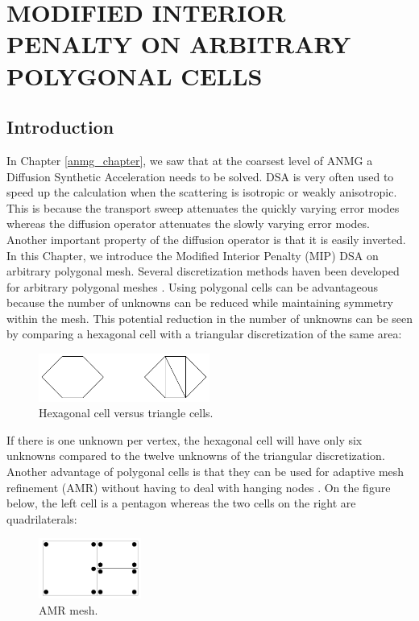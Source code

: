 \chapter{\uppercase{Modified Interior Penalty on Arbitrary Polygonal Cells}}
\label{mip_chapter}
\section{Introduction}
In Chapter \ref{anmg_chapter}, we saw that at the coarsest level of ANMG a Diffusion
Synthetic Acceleration needs to be solved. DSA is very often used to speed up the
calculation when the scattering is isotropic or weakly anisotropic. This is
because the transport sweep attenuates the quickly varying error modes whereas
the diffusion operator attenuates the slowly varying error modes.  Another
important property of the diffusion operator is that it is easily inverted. 
In this Chapter, we introduce the Modified Interior Penalty (MIP) DSA on arbitrary 
polygonal mesh. Several discretization methods haven been developed for 
arbitrary polygonal meshes \cite{pwld_3d,pwl_diffusion,palmer_fe,mimetic,
cell_centered_diff,palmer_proc,palmer_ane,pwld_2d,wachspress}. Using polygonal 
cells can be advantageous because the number of unknowns can be reduced while 
maintaining symmetry within the mesh. This potential reduction in the number of 
unknowns can be seen by comparing a hexagonal cell with a triangular 
discretization of the same area:
\begin{figure}[H]
\centering
\includegraphics[width=0.5\textwidth]{./Dsa/hex_tri_cells}
\caption{Hexagonal cell versus triangle cells.}
\end{figure}
If there is one unknown per vertex, the hexagonal cell will have only six
unknowns compared to the twelve unknowns of the triangular discretization. Another 
advantage of polygonal cells is that they can be used for adaptive mesh 
refinement (AMR) \cite{amr_block,amr_rad,amr_unstruc} without having to
deal with hanging nodes \cite{locally_hanging_nodes,arbitrary_hanging_nodes,
dealII_hanging_nodes}. On the figure below, the left cell is a pentagon 
whereas the two cells on the right are quadrilaterals:
\begin{figure}[H]
\centering
\includegraphics[width=0.3\textwidth]{./Dsa/amr}
\caption{AMR mesh.}
\end{figure}
